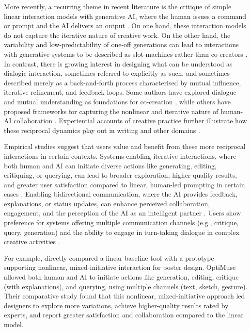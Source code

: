 More recently, a recurring theme in recent literature is the critique of simple linear interaction models with generative AI, where the human issues a command or prompt and the AI delivers an output \citep{Zhou2024-vp, Lin2023-jd, Tholander2023-rv}. On one hand, these interaction models do not capture the iterative nature of creative work. On the other hand, the variability and low-predictability of one-off generations can lead to interactions with generative systems to be described as slot-machines rather than co-creators \citep{Dylan2023-ma}. In contrast, there is growing interest in designing what can be understood as dialogic interaction, sometimes referred to explicitly as such, and sometimes described merely as a back-and-forth process characterised by mutual influence, iterative refinement, and feedback loops. Some authors have explored dialogue and mutual understanding as foundations for co-creation \citep{Bown2020-oc, Wang2021-uy}, while others have proposed frameworks for capturing the nonlinear and iterative nature of human-AI collaboration \citep{Gomez2023-bp, Zhou2024-vp}. Experiential accounts of creative practice further illustrate how these reciprocal dynamics play out in writing and other domains \citep{Ghajargar2022-af, Feldman2017-ip}.

Empirical studies suggest that users value and benefit from these more reciprocal interactions in certain contexts. Systems enabling iterative interactions, where both human and AI can initiate diverse actions like generating, editing, critiquing, or querying, can lead to broader exploration, higher-quality results, and greater user satisfaction compared to linear, human-led prompting in certain cases \citep{Zhou2024-vp, Lin2023-jd}. Enabling bidirectional communication, where the AI provides feedback, explanations, or status updates, can enhance perceived collaboration, engagement, and the perception of the AI as an intelligent partner \citep{Rezwana2023-gj, Rezwana2022-ui}. Users show preference for systems offering multiple communication channels (e.g., critique, query, generation) and the ability to engage in turn-taking dialogue in complex creative activities \citep{Lin2023-jd}.

For example, \citet{Zhou2024-vp} directly compared a linear baseline tool with a prototype supporting nonlinear, mixed-initiative interaction for poster design. OptiMuse allowed both human and AI to initiate actions like generation, editing, critique (with explanations), and querying, using multiple channels (text, sketch, gesture). Their comparative study found that this nonlinear, mixed-initiative approach led designers to explore more variations, achieve higher-quality results rated by experts, and report greater satisfaction and collaboration compared to the linear model.


